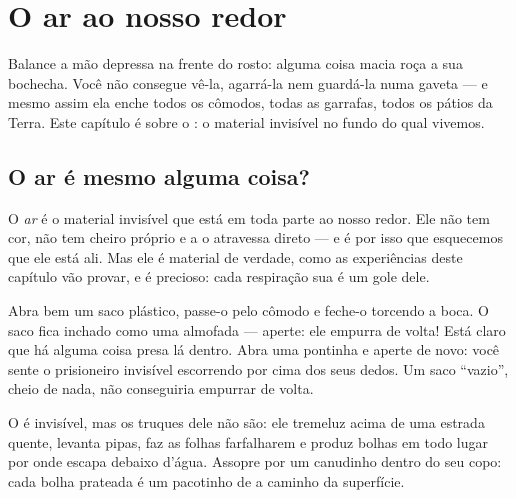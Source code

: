 \chapter{O ar ao nosso redor}\label{ch:g2:air-around-us}

Balance a mão depressa na frente do rosto: alguma coisa macia roça a
sua bochecha. Você não consegue vê-la, agarrá-la nem guardá-la numa
gaveta --- e mesmo assim ela enche todos os cômodos, todas as
garrafas, todos os pátios da Terra. Este capítulo é sobre o : o
material invisível no fundo do qual vivemos.

\section{O ar é mesmo alguma coisa?}

\begin{definition}[Ar]\label{def:g2:air-around-us:air}
O \emph{ar} é o material invisível que está em toda parte
ao nosso redor. Ele não tem cor, não tem cheiro próprio e a  o
atravessa direto --- e é por isso que esquecemos que ele está ali.
Mas ele é material de verdade, como as experiências deste capítulo
vão provar, e é precioso: cada respiração sua é um gole dele.
\end{definition}

\begin{example}\label{ex:g2:air-around-us:catch}
Abra bem um saco plástico, passe-o pelo cômodo e feche-o torcendo a
boca. O saco fica inchado como uma almofada --- aperte: ele empurra
de volta! Está claro que há alguma coisa presa lá dentro. Abra uma
pontinha e aperte de novo: você sente o prisioneiro invisível
escorrendo por cima dos seus dedos. Um saco ``vazio'', cheio de nada,
não conseguiria empurrar de volta.
\end{example}

\begin{example}\label{ex:g2:air-around-us:shows}
O  é invisível, mas os truques dele não são: ele tremeluz acima de
uma estrada quente, levanta pipas, faz as folhas farfalharem e produz
bolhas em todo lugar por onde escapa debaixo d'água. Assopre por um
canudinho dentro do seu copo: cada bolha prateada é um pacotinho de
 a caminho da superfície.
\end{example}

